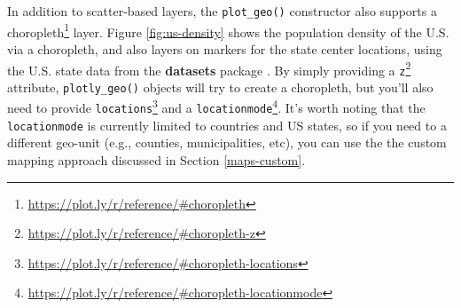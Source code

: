 \documentclass[
  12pt,
]{krantz}
\newenvironment{Shaded}{\begin{snugshade}}{\end{snugshade}}
\newcommand{\DataTypeTok}[1]{\textcolor[rgb]{0.13,0.29,0.53}{#1}}
\newcommand{\DecValTok}[1]{\textcolor[rgb]{0.00,0.00,0.81}{#1}}
\newcommand{\KeywordTok}[1]{\textcolor[rgb]{0.13,0.29,0.53}{\textbf{#1}}}
\newcommand{\NormalTok}[1]{#1}
\newcommand{\OperatorTok}[1]{\textcolor[rgb]{0.81,0.36,0.00}{\textbf{#1}}}
\newcommand{\StringTok}[1]{\textcolor[rgb]{0.31,0.60,0.02}{#1}}
\renewcommand{\href}[2]{#2\footnote{\url{#1}}}
\begin{document}
In addition to scatter-based layers, the \texttt{plot\_geo()} constructor also supports a \href{https://plot.ly/r/reference/\#choropleth}{choropleth} layer. Figure \ref{fig:us-density} shows the population density of the U.S. via a choropleth, and also layers on markers for the state center locations, using the U.S. state data from the \textbf{datasets} package \citep{RCore}. By simply providing a \href{https://plot.ly/r/reference/\#choropleth-z}{\texttt{z}} attribute, \texttt{plotly\_geo()} objects will try to create a choropleth, but you'll also need to provide \href{https://plot.ly/r/reference/\#choropleth-locations}{\texttt{locations}} and a \href{https://plot.ly/r/reference/\#choropleth-locationmode}{\texttt{locationmode}}. It's worth noting that the \texttt{locationmode} is currently limited to countries and US states, so if you need to a different geo-unit (e.g., counties, municipalities, etc), you can use the the custom mapping approach discussed in Section \ref{maps-custom}.

\begin{Shaded}
\end{Shaded}
\end{document}

